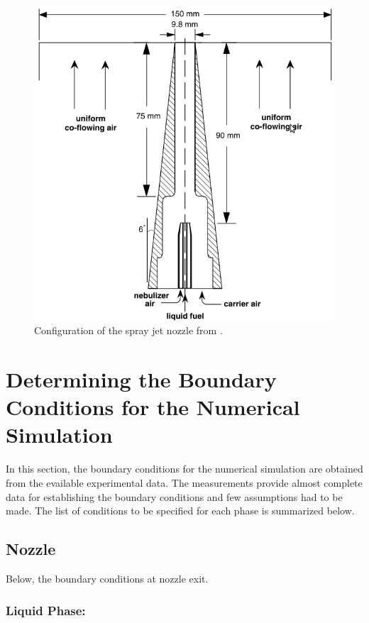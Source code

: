 \begin{figure}[!htb]
 \centering
 \includegraphics[width=0.4\textheight]{./figuras/chap3/setup.png}
 \caption{Configuration of the spray jet nozzle from \cite{chen}.}
 \label{spray_jet}
\end{figure}

\FloatBarrier
 \section[Boundary Conditions for the Numerical Simulation]{Determining the Boundary Conditions for the Numerical Simulation}

In this section, the boundary conditions for the numerical simulation are obtained from the evailable experimental data. The measurements provide almost complete data for establishing the boundary conditions and few assumptions had to be made.
The list of conditions to be specified for each phase is summarized below.

\subsection{Nozzle}

Below, the boundary conditions at nozzle exit.

\subsubsection{Liquid Phase:}

